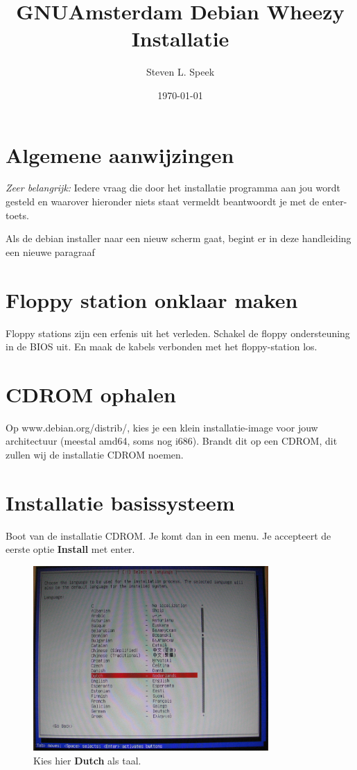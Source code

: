 \documentclass[12pt,a4paper]{article}
\begin{document}
\graphicspath{ {./images/} }
\lstset{language=bash}      
\author{Steven L. Speek}
\title{GNUAmsterdam Debian Wheezy Installatie}
\date{\today}
\maketitle
{}
\section{Algemene aanwijzingen}
\emph{Zeer belangrijk:} Iedere vraag die door het installatie programma aan jou wordt gesteld en waarover hieronder niets staat vermeldt beantwoordt je met de enter-toets.

Als de debian installer naar een nieuw scherm gaat, begint er in deze handleiding een nieuwe paragraaf
\section{Floppy station onklaar maken}
Floppy stations zijn een erfenis uit het verleden. Schakel de floppy ondersteuning in de BIOS uit. En maak de kabels verbonden met het floppy-station los.
\section{CDROM ophalen}
Op www.debian.org/distrib/, kies je een klein installatie-image voor jouw architectuur (meestal amd64, soms nog i686).
Brandt dit op een CDROM, dit zullen wij de installatie CDROM noemen.
\section{Installatie basissysteem}
Boot van de installatie CDROM. Je komt dan in een menu.
Je accepteert de eerste optie \textbf{Install} met enter.
\begin{figure}[h]
\centering
\includegraphics[width=0.8\textwidth]{taal-keuze-scherm}
\caption{Kies hier \textbf{Dutch} als taal.}
\label{fig:taal-keuze-scherm}
\end{figure}
\end{document}
